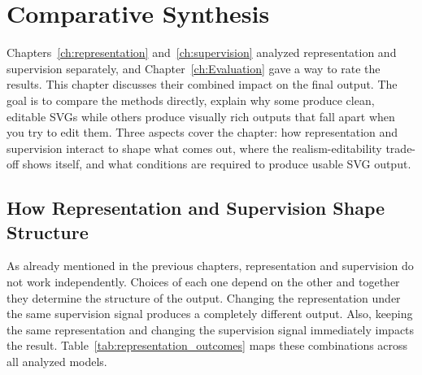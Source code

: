 \chapter{Comparative Synthesis}
\label{ch:synthesis}

Chapters~\ref{ch:representation} and~\ref{ch:supervision} analyzed representation and supervision 
separately, and Chapter~\ref{ch:Evaluation} gave a way to rate the results. This chapter discusses their combined impact on the final output.
The goal is to compare the methods directly, explain why some 
produce clean, editable SVGs while others produce visually 
rich outputs that fall apart when you try to edit them.
Three aspects cover the chapter: how representation and 
supervision interact to shape what comes out, where the 
realism-editability trade-off shows itself, and 
what conditions are required to produce usable SVG output.


\section{How Representation and Supervision Shape Structure}
\label{sec:rep_sup_interaction}

As already mentioned in the previous chapters, 
representation and supervision do not work independently. 
Choices of each one depend on the other and together they determine the structure of the output.  
Changing the representation under the same supervision signal 
produces a completely different output. Also, keeping the same representation and changing the supervision signal 
immediately impacts the result. 
Table~\ref{tab:representation_outcomes} maps these combinations across 
all analyzed models.


